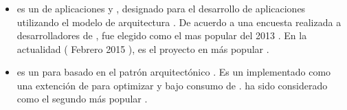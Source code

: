 	\subsubsection{\frameworksPC}
		\begin{itemize}

			\item
				\textbf{\laravelNAME} es un \frameworkPC de aplicaciones \webINT \phpNAME \freePC y \openSourcePC, designado para el desarrollo de aplicaciones \webINT utilizando el modelo de arquitectura \mvcAS. De acuerdo a una encuesta realizada a desarrolladores de \phpNAME, \laravelNAME fue elegido como el \frameworkPC \phpNAME mas popular del 2013 \cite{online_sitepoint_best_php_frameworks_2014}. En la actualidad ( Febrero 2015 ), \laravelNAME es el proyecto \phpNAME en \gitHubNAME más popular \cite{online_popularity_php_proyects}.
			\item
				\textbf{\phalconNAME} es un \frameworkPC \webINT para \phpNAME \highPerformanceQA basado en el patrón arquitectónico \mvcAS. Es un \frameworkPC \openSourcePC implementado como una extención de \cNAME para optimizar \performanceQA y bajo consumo de \resourcesCPT \cite{online_technology_officialsite_phalcon}. \phalconNAME ha sido considerado como el segundo \frameworkPC \phpNAME más popular \cite{online_popularity_php_proyects}.


\end{itemize}
